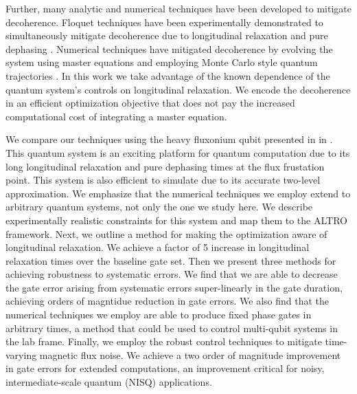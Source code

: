 \documentclass[
  amsfonts,
  amsmath,
  tbtags,
  amssymb,
  aps,
  nobibnotes,
  twocolumn,
  superscriptaddress,
]{revtex4-2}
\begin{document}
Further, many analytic and numerical techniques have been developed to mitigate decoherence.
Floquet techniques have been experimentally demonstrated to simultaneously mitigate
decoherence due to longitudinal relaxation and pure dephasing
\cite{huang2020engineering, mundada2020floquet}.
Numerical techniques have mitigated decoherence by evolving the
system using master equations \cite{rembold2020introduction} and employing
Monte Carlo style quantum trajectories \cite{abdelhafez2019gradient}.
In this work we take advantage of the known dependence of the
quantum system's controls on longitudinal relaxation. We encode
the decoherence in an efficient optimization objective that does
not pay the increased computational cost of integrating a master equation.

We compare our techniques using the heavy fluxonium qubit presented in
in \cite{zhang2020universal}. This quantum system is an exciting
platform for quantum computation due to its long longitudinal relaxation
and pure dephasing times at the flux frustation point. This system is also
efficient to simulate due to its accurate two-level approximation.
We emphasize that the numerical techniques we employ extend to arbitrary quantum systems,
not only the one we study here. We describe experimentally realistic constraints for this system
and map them to the ALTRO framework. Next, we
outline a method for making the optimization aware of longitudinal
relaxation. We achieve a factor of 5 increase in longitudinal relaxation times
over the baseline gate set. Then we present three methods for achieving
robustness to systematic errors. We find that we are able to
decrease the gate error arising from systematic errors super-linearly
in the gate duration, achieving orders of magntidue reduction in gate errors.
We also find that the numerical techniques we employ are able to produce
fixed phase gates in arbitrary times, a method that could be used
to control multi-qubit systems in the lab frame. Finally,
we employ the robust control techniques to mitigate time-varying
magnetic flux noise. We achieve a two order of magnitude improvement
in gate errors for extended computations, an improvement critical
for noisy, intermediate-scale quantum (NISQ) applications.


\end{document}
